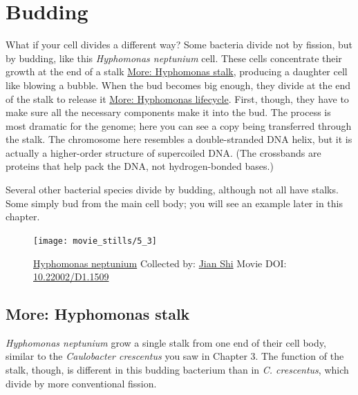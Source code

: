 \documentclass[]{tufte-book}
\begin{document}
\section{Budding}\label{budding}

What if your cell divides a different way? Some bacteria divide not by
fission, but by budding, like this \emph{Hyphomonas neptunium} cell.
These cells concentrate their growth at the end of a stalk
\protect\hyperlink{Hyphomonas_stalk}{More: Hyphomonas stalk}, producing
a daughter cell like blowing a bubble. When the bud becomes big enough,
they divide at the end of the stalk to release it
\protect\hyperlink{Hyphomonas_lifecycle}{More: Hyphomonas lifecycle}.
First, though, they have to make sure all the necessary components make
it into the bud. The process is most dramatic for the genome; here you
can see a copy being transferred through the stalk. The chromosome here
resembles a double-stranded DNA helix, but it is actually a higher-order
structure of supercoiled DNA. (The crossbands are proteins that help
pack the DNA, not hydrogen-bonded bases.)

Several other bacterial species divide by budding, although not all have
stalks. Some simply bud from the main cell body; you will see an example
later in this chapter.





\begin{figure}
\texttt{[image: movie\_stills/5\_3]} \caption[\protect\hyperlink{tree}{Hyphomonas neptunium} Collected by:
\protect\hyperlink{jian_shi}{Jian Shi} Movie DOI:
\href{https://doi.org/10.22002/D1.1509}{10.22002/D1.1509}]{\protect\hyperlink{tree}{Hyphomonas neptunium} Collected by:
\protect\hyperlink{jian_shi}{Jian Shi} Movie DOI:
\href{https://doi.org/10.22002/D1.1509}{10.22002/D1.1509}}\label{fig:5-3}
\end{figure}

\hypertarget{Hyphomonas_stalk}{\subsection*{More: Hyphomonas
stalk}\label{Hyphomonas_stalk}}

\emph{Hyphomonas neptunium} grow a single stalk from one end of their
cell body, similar to the \emph{Caulobacter crescentus} you saw in
Chapter 3. The function of the stalk, though, is different in this
budding bacterium than in \emph{C. crescentus}, which divide by more
conventional fission.
\end{document}
